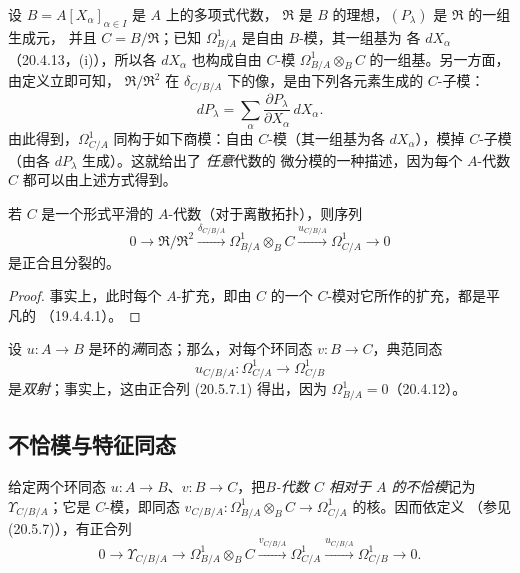 \begin{example}[20.5.13]
\label{0.20.5.13-fr}
设 $B=A[X_\alpha]_{\alpha\in I}$ 是 $A$ 上的多项式代数，
$\mathfrak{R}$ 是 $B$ 的理想，$(P_\lambda)$ 是 $\mathfrak{R}$ 的一组生成元，
并且 $C=B/\mathfrak{R}$；已知 $\Omega^1_{B/A}$ 是自由 $B$-模，其一组基为
各 $dX_\alpha$（20.4.13，(i)），所以各 $dX_\alpha$ 也构成自由 $C$-模
$\Omega^1_{B/A}\otimes_B C$ 的一组基。另一方面，由定义立即可知，
$\mathfrak{R}/\mathfrak{R}^2$ 在 $\delta_{C/B/A}$ 下的像，是由下列各元素生成的
$C$-子模：
\[
  dP_\lambda=\sum_\alpha
  \frac{\partial P_\lambda}{\partial X_\alpha}\,dX_\alpha.
\]
由此得到，$\Omega^1_{C/A}$ 同构于如下商模：自由 $C$-模（其一组基为各
$dX_\alpha$），模掉 $C$-子模（由各 $dP_\lambda$ 生成）。这就给出了
\emph{任意}代数的
微分模的一种描述，因为每个 $A$-代数 $C$ 都可以由上述方式得到。
\end{example}

\begin{corollary}[20.5.14]
\label{0.20.5.14-fr}
若 $C$ 是一个形式平滑的 $A$-代数（对于离散拓扑），则序列
\begin{equation}
\tag{20.5.14.1}
\label{0.20.5.14.1-fr}
  0\longrightarrow\mathfrak{R}/\mathfrak{R}^2
  \xrightarrow{\delta_{C/B/A}}\Omega^1_{B/A}\otimes_B C
  \xrightarrow{u_{C/B/A}}\Omega^1_{C/A}\longrightarrow0
\end{equation}
是正合且分裂的。
\end{corollary}

\begin{proof}
事实上，此时每个 $A$-扩充，即由 $C$ 的一个 $C$-模对它所作的扩充，都是平凡的
（19.4.4.1）。
\end{proof}

\begin{remark}[20.5.15]
\label{0.20.5.15-fr}
设 $u:A\to B$ 是环的\emph{满}同态；那么，对每个环同态
$v:B\to C$，典范同态
\begin{equation}
\tag{20.5.15.1}
\label{0.20.5.15.1-fr}
  u_{C/B/A}:\Omega^1_{C/A}\longrightarrow\Omega^1_{C/B}
\end{equation}
是\emph{双射}；事实上，这由正合列 (20.5.7.1) 得出，因为
$\Omega^1_{B/A}=0$（20.4.12）。
\end{remark}

\subsection{不恰模与特征同态}
\label{subsection:0.20.6-fr}
\label{0.20.6-fr}

\begin{definition}[20.6.1]
\label{0.20.6.1-fr}
给定两个环同态 $u:A\to B$、$v:B\to C$，把\emph{$B$-代数 $C$ 相对于
$A$ 的不恰模}记为 $\Upsilon_{C/B/A}$；它是 $C$-模，即同态
$v_{C/B/A}:\Omega^1_{B/A}\otimes_B C\to\Omega^1_{C/A}$ 的核。因而依定义
（参见 (20.5.7)），有正合列
\begin{equation}
\tag{20.6.1.1}
\label{0.20.6.1.1-fr}
  0\longrightarrow\Upsilon_{C/B/A}\longrightarrow
  \Omega^1_{B/A}\otimes_B C\xrightarrow{v_{C/B/A}}
  \Omega^1_{C/A}\xrightarrow{u_{C/B/A}}\Omega^1_{C/B}
  \longrightarrow0.
\end{equation}
\end{definition}

